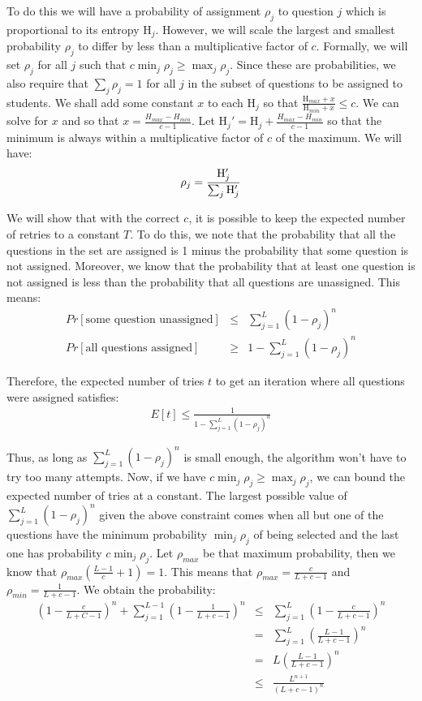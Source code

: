 \documentclass[psamsfonts]{amsart}
\begin{document}
To do this we will have a probability of assignment $\rho_j$ to question $j$ which is proportional to its entropy $\mathrm{H}_j$. However, we will scale the largest and smallest probability $\rho_j$ to differ by less than a multiplicative factor of $c$. Formally, we will set $\rho_j$ for all $j$ such that $c \min_j \rho_j \geq \max_j \rho_j$. Since these are probabilities, we also require that $\sum_{j} \rho_j = 1$ for all $j$ in the subset of questions to be assigned to students. We shall add some constant $x$ to each $\mathrm{H}_j$ so that $\frac{\mathrm{H}_{max} + x}{\mathrm{H}_{min} + x} \leq c$. We can solve for $x$ and so that $x = \frac{H_{max} - H_{min}}{c - 1}$. Let $\mathrm{H}_j' = \mathrm{H}_{j} + \frac{H_{max} - H_{min}}{c - 1}$ so that the minimum is always within a multiplicative factor of $c$ of the maximum. We will have:
\begin{eqnarray}
\rho_j = {{\mathrm{H}_j'} \over {\sum_j \mathrm{H}_j'}}
\end{eqnarray}

We will show that with the correct $c$, it is possible to keep the expected number of retries to a constant $T$. To do this, we note that the probability that all the questions in the set are assigned is 1 minus the probability that some question is not assigned. Moreover, we know that the probability that at least one question is not assigned is less than the probability that all questions are unassigned. This means:
\begin{eqnarray}
Pr[\text{some question unassigned}] &\leq& \sum_{j=1}^L (1- \rho_j)^n \\
Pr[\text{all questions assigned}] &\geq& 1 - \sum_{j=1}^L (1 - \rho_j)^n 
\end{eqnarray}

Therefore, the expected number of tries $t$ to get an iteration where all questions were assigned satisfies:
\begin{eqnarray}
E[t] \leq \frac{1}{1 - \sum_{j=1}^L (1 - \rho_j)^n}
\end{eqnarray}

Thus, as long as $\sum_{j=1}^L (1 - \rho_j)^n$ is small enough, the algorithm won't have to try too many attempts. Now, if we have $c \min_j \rho_j \geq \max_j \rho_j$, we can bound the expected number of tries at a constant. The largest possible value of $\sum_{j=1}^L (1- \rho_j)^n$ given the above constraint comes when all but one of the questions have the minimum probability $\min_j \rho_j$ of being selected and the last one has probability $c \min_j \rho_j$. Let $\rho_{max}$ be that maximum probability, then we know that $\rho_{max}\left( \frac{L-1}{c} + 1 \right) = 1$. This means that $\rho_{max} = \frac{c}{L + c - 1}$ and $\rho_{min} = \frac{1}{L + c - 1}$. We obtain the probability:
\begin{eqnarray}
\left(1- \frac{c}{L+C-1} \right)^n + \sum_{j=1}^{L-1} \left(1 - \frac{1}{L+c-1} \right)^n &\leq& \sum_{j=1}^L \left( 1 - \frac{c}{L + c-1} \right)^n \\
&=& \sum_{j=1}^L \left( \frac{L-1}{L+c-1} \right)^n \\
&=& L \left( \frac{L-1}{L+c-1} \right)^n \\
&\leq& \frac{L^{n+1}}{(L+c-1)^n}
\end{eqnarray}
\end{document}
